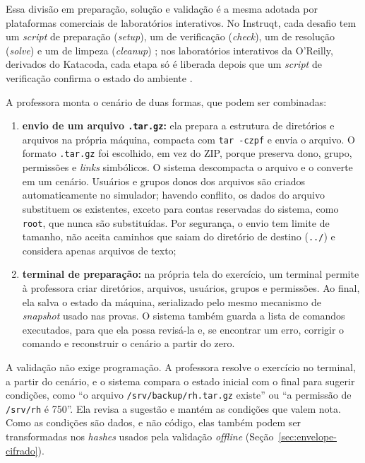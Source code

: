 Essa divisão em preparação, solução e validação é a mesma adotada por plataformas comerciais de laboratórios interativos. No Instruqt, cada desafio tem um \textit{script} de preparação (\textit{setup}), um de verificação (\textit{check}), um de resolução (\textit{solve}) e um de limpeza (\textit{cleanup}) \cite{instruqt2026lifecycle}; nos laboratórios interativos da O'Reilly, derivados do Katacoda, cada etapa só é liberada depois que um \textit{script} de verificação confirma o estado do ambiente \cite{oreilly2026verified}.

A professora monta o cenário de duas formas, que podem ser combinadas:

\begin{enumerate}
    \item \textbf{envio de um arquivo \texttt{.tar.gz}:} ela prepara a estrutura de diretórios e arquivos na própria máquina, compacta com \texttt{tar -czpf} e envia o arquivo. O formato \texttt{.tar.gz} foi escolhido, em vez do ZIP, porque preserva dono, grupo, permissões e \textit{links} simbólicos. O sistema descompacta o arquivo e o converte em um cenário. Usuários e grupos donos dos arquivos são criados automaticamente no simulador; havendo conflito, os dados do arquivo substituem os existentes, exceto para contas reservadas do sistema, como \texttt{root}, que nunca são substituídas. Por segurança, o envio tem limite de tamanho, não aceita caminhos que saiam do diretório de destino (\texttt{../}) e considera apenas arquivos de texto;
    \item \textbf{terminal de preparação:} na própria tela do exercício, um terminal permite à professora criar diretórios, arquivos, usuários, grupos e permissões. Ao final, ela salva o estado da máquina, serializado pelo mesmo mecanismo de \textit{snapshot} usado nas provas. O sistema também guarda a lista de comandos executados, para que ela possa revisá-la e, se encontrar um erro, corrigir o comando e reconstruir o cenário a partir do zero.
\end{enumerate}

A validação não exige programação. A professora resolve o exercício no terminal, a partir do cenário, e o sistema compara o estado inicial com o final para sugerir condições, como ``o arquivo \texttt{/srv/backup/rh.tar.gz} existe'' ou ``a permissão de \texttt{/srv/rh} é 750''. Ela revisa a sugestão e mantém as condições que valem nota. Como as condições são dados, e não código, elas também podem ser transformadas nos \textit{hashes} usados pela validação \textit{offline} (Seção~\ref{sec:envelope-cifrado}).

